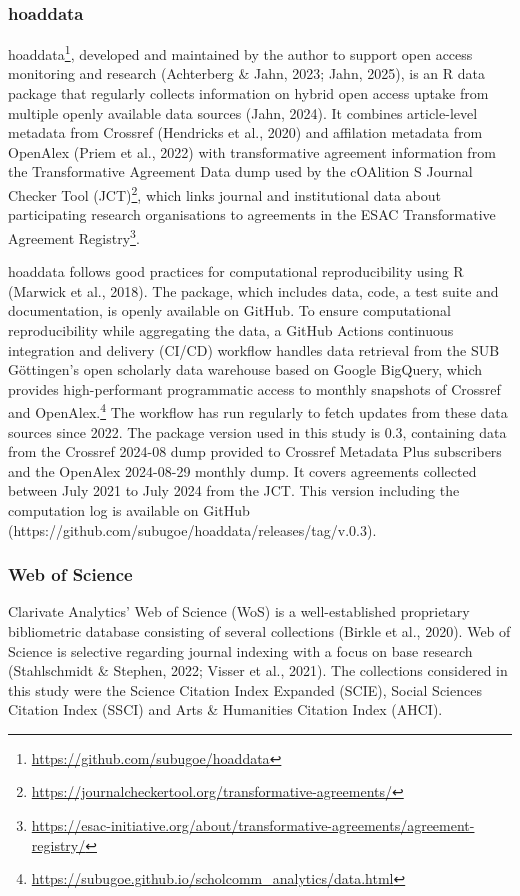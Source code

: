 \documentclass[a4paper,man,floatsintext,longtable,noextraspace,10pt]{apa6}
\begin{document}
\subsubsection{hoaddata}\label{hoaddata}

hoaddata\footnote{\url{https://github.com/subugoe/hoaddata}}, developed
and maintained by the author to support open access monitoring and
research (Achterberg \& Jahn, 2023; Jahn, 2025), is an R data package
that regularly collects information on hybrid open access uptake from
multiple openly available data sources (Jahn, 2024). It combines
article-level metadata from Crossref (Hendricks et al., 2020) and
affilation metadata from OpenAlex (Priem et al., 2022) with
transformative agreement information from the Transformative Agreement
Data dump used by the cOAlition S Journal Checker Tool (JCT)\footnote{\url{https://journalcheckertool.org/transformative-agreements/}},
which links journal and institutional data about participating research
organisations to agreements in the ESAC Transformative Agreement
Registry\footnote{\url{https://esac-initiative.org/about/transformative-agreements/agreement-registry/}}.

hoaddata follows good practices for computational reproducibility using
R (Marwick et al., 2018). The package, which includes data, code, a test
suite and documentation, is openly available on GitHub. To ensure
computational reproducibility while aggregating the data, a GitHub
Actions continuous integration and delivery (CI/CD) workflow handles
data retrieval from the SUB Göttingen's open scholarly data warehouse
based on Google BigQuery, which provides high-performant programmatic
access to monthly snapshots of Crossref and OpenAlex.\footnote{\url{https://subugoe.github.io/scholcomm_analytics/data.html}}
The workflow has run regularly to fetch updates from these data sources
since 2022. The package version used in this study is 0.3, containing
data from the Crossref 2024-08 dump provided to Crossref Metadata Plus
subscribers and the OpenAlex 2024-08-29 monthly dump. It covers
agreements collected between July 2021 to July 2024 from the JCT. This
version including the computation log is available on GitHub
(https://github.com/subugoe/hoaddata/releases/tag/v.0.3).

\subsubsection{Web of Science}\label{web-of-science}

Clarivate Analytics' Web of Science (WoS) is a well-established
proprietary bibliometric database consisting of several collections
(Birkle et al., 2020). Web of Science is selective regarding journal
indexing with a focus on base research (Stahlschmidt \& Stephen, 2022;
Visser et al., 2021). The collections considered in this study were the
Science Citation Index Expanded (SCIE), Social Sciences Citation Index
(SSCI) and Arts \& Humanities Citation Index (AHCI).
\end{document}
